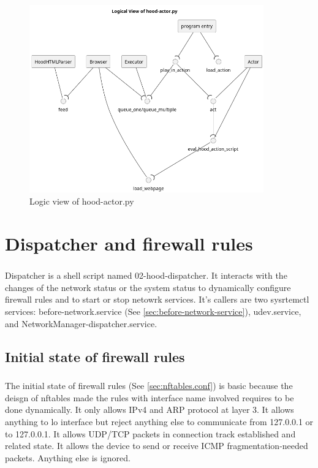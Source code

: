 \documentclass[mscthesis]{usiinfthesis}
\begin{document}
\begin{figure}[H]
  \includegraphics[width=0.9\textwidth]{graphics/puml/actor.png}
  \caption{Logic view of hood-actor.py}
  \label{fig:actor-logic-view}
\end{figure}

\chapter{Dispatcher and firewall rules}\label{cha:dispatcher}
\paragraph{}
Dispatcher is a shell script named 02-hood-dispatcher. It interacts with the changes of the network status or the system status to dynamically configure firewall rules and to start or stop netowrk services. It's callers are two sysrtemctl services: before-network.service (See \cref{sec:before-network-service}), udev.service, and NetworkManager-dispatcher.service.

\section{Initial state of firewall rules}
\paragraph{}
The initial state of firewall rules (See \cref{sec:nftables.conf}) is basic because the deisgn of nftables made the rules with interface name involved requires to be done dynamically. It only allows IPv4 and ARP protocol at layer 3. It allows anything to lo interface but reject anything else to communicate from 127.0.0.1 or to 127.0.0.1. It allows UDP/TCP packets in connection track established and related
state. It allows the device to send or receive ICMP fragmentation-needed packets. Anything else is ignored.
\end{document}
